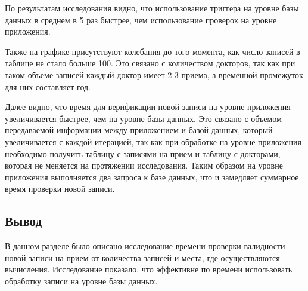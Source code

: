 По результатам исследования видно, что использование триггера на уровне базы данных в среднем в 5 раз быстрее, чем использование проверок на уровне приложения. 

Также на графике присутствуют колебания до того момента, как число записей в таблице не стало больше 100. Это связано с количеством докторов, так как при таком объеме записей каждый доктор имеет 2-3 приема, а временной промежуток для них составляет год. 

Далее видно, что время для верификации новой записи на уровне приложения увеличивается быстрее, чем на уровне базы данных. Это связано с объемом передаваемой информации между приложением и базой данных, который увеличивается с каждой итерацией, так как при обработке на уровне приложения необходимо получить таблицу с записями на прием и таблицу с докторами, которая не меняется на протяжении исследования. Таким образом на уровне приложения выполняется два запроса к базе данных, что и замедляет суммарное время проверки новой записи. 


\subsection*{Вывод}
В данном разделе было описано исследование времени проверки валидности новой записи на прием от количества записей и места, где осуществляются вычисления. Исследование показало, что эффективне по времени использовать обработку записи на уровне базы данных.
